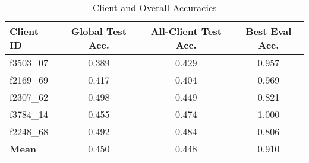 \begin{table}[ht]
\centering
\small
\renewcommand{\arraystretch}{1.2}
\setlength{\tabcolsep}{6pt}
\begin{tabular}{|l|c|c|c|}
\hline
\rowcolor{black!40}
{\color{white}\textbf{Client ID}} & {\color{white}\textbf{Global Test Acc.}} & {\color{white}\textbf{All-Client Test Acc.}} & {\color{white}\textbf{Best Eval Acc.}} \\
\hline
f3503\_07 & 0.389 & 0.429 & 0.957 \\
\hline
f2169\_69 & 0.417 & 0.404 & 0.969 \\
\hline
f2307\_62 & 0.498 & 0.449 & 0.821 \\
\hline
f3784\_14 & 0.455 & 0.474 & 1.000 \\
\hline
f2248\_68 & 0.492 & 0.484 & 0.806 \\
\hline
\rowcolor{gray!20}
\textbf{Mean} & 0.450 & 0.448 & 0.910 \\
\hline
\end{tabular}
\caption{Client and Overall Accuracies}
\label{tab:client_summary}
\end{table}